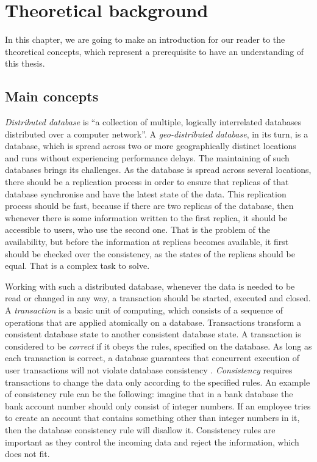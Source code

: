 \chapter{Theoretical background}
\label{Background}

In this chapter, we are going to make an introduction for our reader to the theoretical concepts, which represent a prerequisite to have an understanding of this thesis.

\section{Main concepts}
\label{Background-Main}

\textit{Distributed database} is ``a collection of multiple, logically interrelated databases distributed over a computer network''\cite{11}. A \textit{geo-distributed database}, in its turn, is a database, which is spread across two or more geographically distinct locations and runs without experiencing performance delays. The maintaining of such databases brings its challenges. As the database is spread across several locations, there should be a replication process in order to ensure that replicas of that database synchronise and have the latest state of the data. This replication process should be fast, because if there are two replicas of the database, then whenever there is some information written to the first replica, it should be accessible to users, who use the second one. That is the problem of the availability, but before the information at replicas becomes available, it first should be checked over the consistency, as the states of the replicas should be equal. That is a complex task to solve. 

Working with such a distributed database, whenever the data is needed to be read or changed in any way, a transaction should be started, executed and closed. A \textit{transaction} is a basic unit of computing, which consists of a sequence of operations that are applied atomically on a database. Transactions transform a consistent database state to another consistent database state. A transaction is considered to be \textit{correct} if it obeys the rules, specified on the database. As long as each transaction is correct, a database guarantees that concurrent execution of user transactions will not violate database consistency \cite{11}. \textit{Consistency} requires transactions to change the data only according to the specified rules. An example of consistency rule can be the following: imagine that in a bank database the bank account number should only consist of integer numbers. If an employee tries to create an account that contains something other than integer numbers in it, then the database consistency rule will disallow it. Consistency rules are important as they control the incoming data and reject the information, which does not fit.

